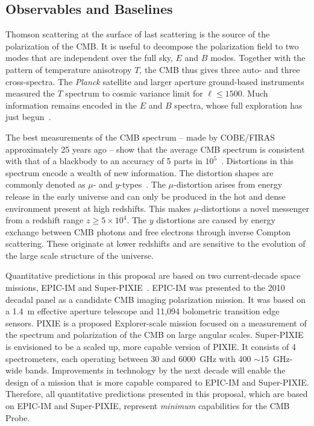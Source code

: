 
\subsection{Observables and Baselines}
\label{sec:observables}

\vspace{-0.05in}

Thomson scattering at the surface of last scattering is the source of the polarization of the \ac{CMB}. It is useful 
to decompose the polarization field to two modes that are independent over the full sky, $E$ and $B$ modes. 
Together with the pattern of temperature anisotropy $T$, the \ac{CMB} thus gives three auto- and three cross-spectra. 
The {\it Planck} satellite and larger aperture ground-based instruments measured the $T$ spectrum to cosmic
variance limit for $\ell \leq 1500$. Much information remains encoded in the $E$ and $B$ spectra, whose full exploration 
has just begun~\cite{Hanson2013,PB_BB,bicep2Bmode, bkp2015}.  

The best measurements of the \ac{CMB} spectrum -- made by COBE/FIRAS approximately 25 years ago --
show that the average CMB spectrum is consistent with that of a blackbody to an accuracy of 5 parts 
in $10^{5}$~\cite{Mather1994, Fixsen1996}. Distortions in this spectrum encode a wealth of new information.
The distortion shapes are commonly denoted as $\mu$- and $y$-types~\cite{Zeldovich1969, Sunyaev1970mu}. The 
$\mu$-distortion arises from energy release in the early universe and can only be produced in the hot and dense 
environment present at high redshifts. This makes $\mu$-distortions a novel messenger from a redshift 
range $ z \geq 5\times10^{4} $. The $y$ distortions are caused by 
energy exchange between \ac{CMB} photons and free electrons through inverse Compton 
scattering. These originate at lower redshifts and are sensitive to the 
evolution of the large scale structure of the universe. 

Quantitative predictions in this proposal are based on two current-decade space missions, 
EPIC-IM and Super-PIXIE~\cite{bock2009, Kogut2011PIXIE}. EPIC-IM was presented 
to the 2010 decadal panel as a candidate \ac{CMB} imaging polarization mission. 
It was based on a 1.4~m effective aperture telescope and 11,094 bolometric transition edge sensors. 
PIXIE is a proposed Explorer-scale mission focused on a measurement of the spectrum 
and polarization of the CMB on large angular scales. Super-PIXIE is envisioned to be a scaled up, 
more capable version of PIXIE. It consists of 4 spectrometers, each operating between 
30 and 6000~GHz with 400 $\sim$15~GHz-wide bands. Improvements in technology by the next decade will enable 
the design of a mission that is more capable compared to EPIC-IM and Super-PIXIE. Therefore, all 
quantitative predictions presented in this proposal, which are based on EPIC-IM and Super-PIXIE, 
represent {\it minimum} capabilities for the CMB Probe. 



